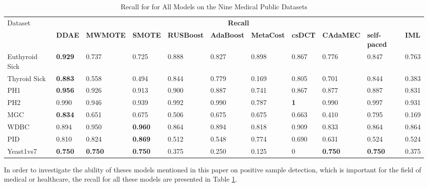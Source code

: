 \begin{table}[h]
    \begin{tabular}{|p{}<{\centering}|p{}<{\centering}|p{}<{\centering}|p{}<{\centering}|p{}<{\centering}|p{}<{\centering}|p{}<{\centering}|p{}<{\centering}|p{}<{\centering}|p{}<{\centering}|p{}<{\centering}|}
    \hline
    \multirow{2}{*}{Dataset} & \multicolumn{10}{c|}{\textbf{Recall}}    \\ \cline{2-11} 
                             & \tiny\textbf{DDAE} & \tiny\textbf{MWMOTE} & \tiny\textbf{SMOTE} & \tiny\textbf{RUSBoost} & \tiny\textbf{AdaBoost} & \tiny\textbf{MetaCost} & \tiny\textbf{csDCT} & \tiny\textbf{CAdaMEC} &
                            \tiny\textbf{self-paced} & \tiny\textbf{IML}\\ \hline
    Euthyroid Sick                     &\textbf{0.929}&0.737&0.725&0.888&0.827&0.898&0.867&0.776&0.847&0.763\\ \hline
    Thyroid Sick                   
    &\textbf{0.883}&0.558&0.494&0.844&0.779&0.169&0.805&0.701&0.844&0.383\\ \hline
    PH1                    
    &\textbf{0.956}&0.926&0.913&0.900&0.887&0.741&0.867&0.877&0.887&0.831\\ \hline
    PH2                 
    &0.990&0.946&0.939&0.992&0.990&0.787&\textbf{1}&0.990&0.997&0.931\\ \hline
    MGC                 
    &\textbf{0.834}&0.651&0.675&0.506&0.675&0.675&0.663&0.410&0.795&0.169\\ \hline
    WDBC                    
    &0.894&0.950&\textbf{0.960}&0.864&0.894&0.818&0.909&0.833&0.864&0.864\\ \hline
    PID                  
    &0.810&0.824&\textbf{0.869}&0.512&0.548&0.774&0.690&0.631&0.524&0.524\\ \hline
    Yeast1vs7               
    &\textbf{0.750}&\textbf{0.750}&\textbf{0.750}&0.375&0.250&0.125&0&\textbf{0.750}&\textbf{0.750}&0.375\\ \hline
    \end{tabular}
    \caption{Recall for for All Models on the Nine Medical Public Datasets}
    \label{tab23}
\end{table}
In order to investigate the ability of theses models mentioned in this paper on positive sample detection, which is important for the field of medical or healthcare, the recall for all these models are presented in Table \ref{tab23}.  

